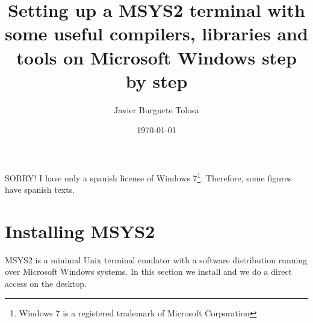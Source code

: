 \documentclass[a4paper]{article}
\title{Setting up a MSYS2 terminal with some useful compilers, libraries
and tools on Microsoft Windows step by step}
\author{Javier Burguete Tolosa}
\date{\today}
\begin{document}
\maketitle

\tableofcontents

\section*{}

SORRY! I have only a spanish license of Windows 7\footnote{Windows 7 is a
registered trademark of Microsoft Corporation}. Therefore, some figures have
spanish texts.

\clearpage

\section{Installing MSYS2}

MSYS2 is a minimal Unix terminal emulator with a software distribution running
over Microsoft Windows systems. In this section we install and we do a direct
access on the desktop.
\end{document}
